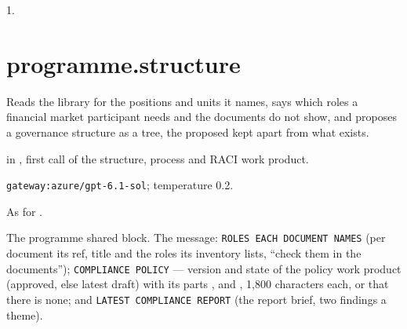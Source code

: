  1.


\section{programme.structure}\label{sec:aprompts:programme-structure}

 Reads the library for the positions and units it names, says which
roles a financial market participant needs and the documents do not show, and proposes a
governance structure as a tree, the proposed kept apart from what exists.

  in , first call of the
structure, process and RACI work product.

 \texttt{gateway:azure/gpt-6.1-sol}; temperature 0.2.

 As for .

 The programme shared block. The message:
\texttt{ROLES EACH DOCUMENT NAMES} (per document its ref, title and the roles its inventory lists,
\enquote{check them in the documents}); \texttt{COMPLIANCE POLICY} --- version and state of the
policy work product (approved, else latest draft) with its parts , 
and , 1{,}800 characters each, or that there is none; and
\texttt{LATEST COMPLIANCE REPORT} (the report brief, two findings a theme).

